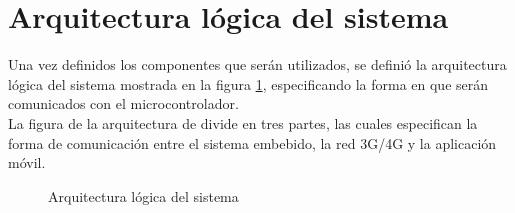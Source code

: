 \section{Arquitectura lógica del sistema}
Una vez definidos los componentes que serán utilizados, se definió la arquitectura lógica del sistema mostrada en la figura \ref{fig:DisenoArquiLogica}, especificando la forma en que serán comunicados con el microcontrolador.\\

La figura de la arquitectura de divide en tres partes, las cuales especifican la forma de comunicación entre el sistema embebido, la red 3G/4G y la aplicación móvil.\\

\begin{figure}[htbp!]
	\centering
	\caption{Arquitectura lógica del sistema}
	\label{fig:DisenoArquiLogica}
\end{figure}